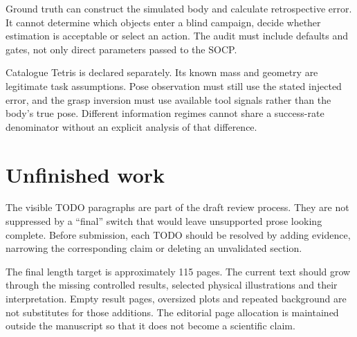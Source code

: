 Ground truth can construct the simulated body and calculate retrospective error. It cannot determine which objects enter a blind campaign, decide whether estimation is acceptable or select an action. The audit must include defaults and gates, not only direct parameters passed to the SOCP.

Catalogue Tetris is declared separately. Its known mass and geometry are legitimate task assumptions. Pose observation must still use the stated injected error, and the grasp inversion must use available tool signals rather than the body's true pose. Different information regimes cannot share a success-rate denominator without an explicit analysis of that difference.

\section{Unfinished work}

The visible TODO paragraphs are part of the draft review process. They are not suppressed by a ``final'' switch that would leave unsupported prose looking complete. Before submission, each TODO should be resolved by adding evidence, narrowing the corresponding claim or deleting an unvalidated section.

The final length target is approximately 115 pages. The current text should grow through the missing controlled results, selected physical illustrations and their interpretation. Empty result pages, oversized plots and repeated background are not substitutes for those additions. The editorial page allocation is maintained outside the manuscript so that it does not become a scientific claim.



